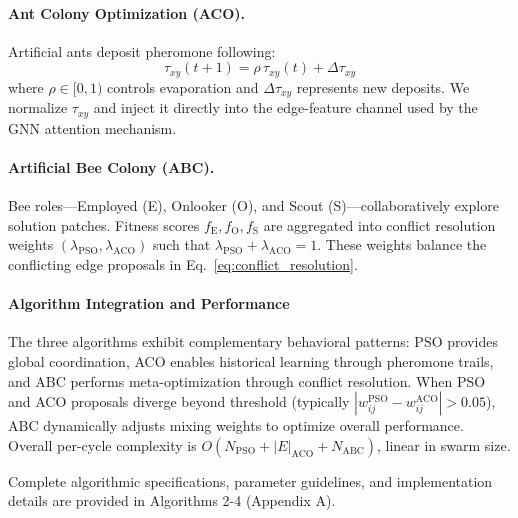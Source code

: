 \documentclass{article}
\begin{document}
\paragraph{Ant Colony Optimization (ACO).}
Artificial ants deposit pheromone following:
\begin{equation}
\tau_{xy}(t{+}1) = \rho\,\tau_{xy}(t) + \Delta\tau_{xy}
\end{equation}
where $\rho \in [0,1)$ controls evaporation and $\Delta\tau_{xy}$ represents new deposits. We normalize $\tau_{xy}$ and inject it directly into the edge-feature channel used by the GNN attention mechanism.

\paragraph{Artificial Bee Colony (ABC).}
Bee roles—Employed (E), Onlooker (O), and Scout (S)—collaboratively explore solution patches. Fitness scores $f_{\text{E}}, f_{\text{O}}, f_{\text{S}}$ are aggregated into conflict resolution weights $(\lambda_{\text{PSO}}, \lambda_{\text{ACO}})$ such that $\lambda_{\text{PSO}} + \lambda_{\text{ACO}} = 1$. These weights balance the conflicting edge proposals in Eq.~\eqref{eq:conflict_resolution}.

\paragraph{Algorithm Integration and Performance}
The three algorithms exhibit complementary behavioral patterns: PSO provides global coordination, ACO enables historical learning through pheromone trails, and ABC performs meta-optimization through conflict resolution. When PSO and ACO proposals diverge beyond threshold (typically $|w_{ij}^{\text{PSO}} - w_{ij}^{\text{ACO}}| > 0.05$), ABC dynamically adjusts mixing weights to optimize overall performance. Overall per-cycle complexity is $O(N_{\text{PSO}} + |E|_{\text{ACO}} + N_{\text{ABC}})$, linear in swarm size.

Complete algorithmic specifications, parameter guidelines, and implementation details are provided in Algorithms 2-4 (Appendix A).
\end{document}
